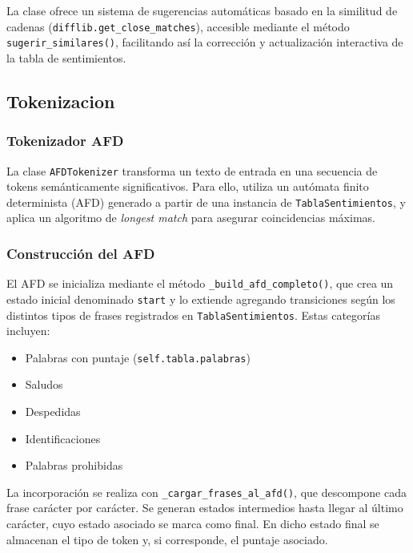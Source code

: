 La clase ofrece un sistema de sugerencias automáticas basado en la similitud de cadenas
(\texttt{difflib.get\_close\_matches}), accesible mediante el método \texttt{sugerir\_similares()},
facilitando así la corrección y actualización interactiva de la tabla de sentimientos.

\subsection{Tokenizacion}

\subsubsection{Tokenizador AFD}

La clase \texttt{AFDTokenizer} transforma un texto de entrada en una secuencia de tokens
semánticamente significativos. Para ello, utiliza un autómata finito determinista (AFD)
generado a partir de una instancia de \texttt{TablaSentimientos}, y aplica un algoritmo de
\textit{longest match} para asegurar coincidencias máximas.

\subsubsection{Construcción del AFD}

El AFD se inicializa mediante el método \texttt{\_build\_afd\_completo()}, que crea un estado
inicial denominado \texttt{start} y lo extiende agregando transiciones según los distintos
tipos de frases registrados en \texttt{TablaSentimientos}. Estas categorías incluyen:

\begin{itemize}
	\item Palabras con puntaje (\texttt{self.tabla.palabras})
	\item Saludos
	\item Despedidas
	\item Identificaciones
	\item Palabras prohibidas
\end{itemize}

La incorporación se realiza con \texttt{\_cargar\_frases\_al\_afd()}, que descompone cada frase
carácter por carácter. Se generan estados intermedios hasta llegar al último carácter, cuyo
estado asociado se marca como final. En dicho estado final se almacenan el tipo de token y, si
corresponde, el puntaje asociado.

